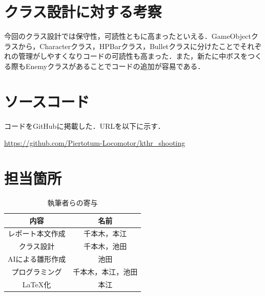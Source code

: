 \documentclass[dvipdfmx]{jlreq}
\begin{document}
\section{クラス設計に対する考察}
今回のクラス設計では保守性，可読性ともに高まったといえる．GameObjectクラスから，Characterクラス，HPBarクラス，Bulletクラスに分けたことでそれぞれの管理がしやすくなりコードの可読性も高まった．また，新たに中ボスをつくる際もEnemyクラスがあることでコードの追加が容易である．

\section{ソースコード}
コードをGitHubに掲載した．URLを以下に示す．

\url{https://github.com/Piertotum-Locomotor/kthr_shooting}
\section{担当箇所}
\begin{table}[hbtp]
  \caption{執筆者らの寄与}
  \label{contribution}
  \centering
  \begin{tabular}{|c|c|}
    \hline
    内容 & 名前 \\
    \hline\hline
    レポート本文作成 & 千本木，本江 \\
    \hline
    クラス設計 &  千本木，池田\\
    \hline
    AIによる雛形作成 & 池田 \\
    \hline
    プログラミング & 千本木，本江，池田 \\
    \hline
    \LaTeX 化 & 本江\\
    \hline
  \end{tabular}
\end{table}
\end{document}
